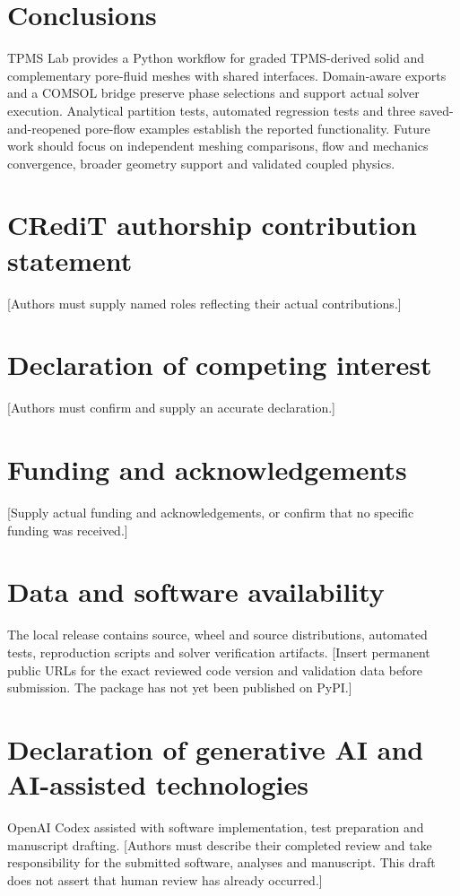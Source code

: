 \documentclass[preprint,12pt,a4paper]{elsarticle}
\begin{document}
\FloatBarrier
\section{Conclusions}

TPMS Lab provides a Python workflow for graded TPMS-derived solid and complementary pore-fluid meshes with shared interfaces. Domain-aware exports and a COMSOL bridge preserve phase selections and support actual solver execution. Analytical partition tests, automated regression tests and three saved-and-reopened pore-flow examples establish the reported functionality. Future work should focus on independent meshing comparisons, flow and mechanics convergence, broader geometry support and validated coupled physics.

\section*{CRediT authorship contribution statement}

[Authors must supply named roles reflecting their actual contributions.]

\section*{Declaration of competing interest}

[Authors must confirm and supply an accurate declaration.]

\section*{Funding and acknowledgements}

[Supply actual funding and acknowledgements, or confirm that no specific funding was received.]

\section*{Data and software availability}

The local release contains source, wheel and source distributions, automated tests, reproduction scripts and solver verification artifacts. [Insert permanent public URLs for the exact reviewed code version and validation data before submission. The package has not yet been published on PyPI.]

\section*{Declaration of generative AI and AI-assisted technologies}

OpenAI Codex assisted with software implementation, test preparation and manuscript drafting. [Authors must describe their completed review and take responsibility for the submitted software, analyses and manuscript. This draft does not assert that human review has already occurred.]

\FloatBarrier
\small
\setlength{\bibsep}{3pt}


\end{document}
